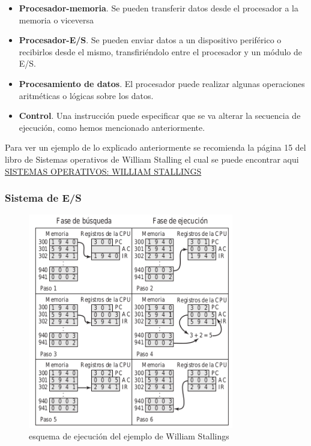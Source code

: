 \documentclass{article}
\begin{document}
					\begin{itemize}
						\item \textbf{Procesador-memoria}. Se pueden transferir datos desde el procesador a la memoria o viceversa
						\item \textbf{Procesador-E/S}. Se pueden enviar datos a un dispositivo periférico o recibirlos desde el mismo, transfiriéndolo entre el procesador y un módulo de E/S.
						\item \textbf{Procesamiento de datos}. El procesador puede realizar algunas operaciones aritméticas o lógicas sobre los datos.
						\item \textbf{Control}. Una instrucción puede especificar que se va alterar la secuencia de ejecución, como hemos mencionado anteriormente.
					\end{itemize}
					
					Para ver un ejemplo de lo explicado anteriormente se recomienda la página 15 del libro de Sistemas operativos de William Stalling el cual se puede encontrar aqui 
					\href{http://cotana.informatica.edu.bo/downloads/Sistemas%20Operativos.pdf}{SISTEMAS OPERATIVOS: WILLIAM STALLINGS}
					
				
				\subsubsection{Sistema de E/S}
				
				\begin{figure}
					\caption{esquema de ejecución del ejemplo de William Stallings}
					\label{figura3:ejemplo}
					\centering
					\includegraphics[width=0.8\textwidth, scale=1]{figura3.png}
				\end{figure}
					
\end{document}
